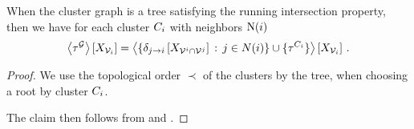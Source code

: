 \begin{theorem}
	When the cluster graph is a tree satisfying the running intersection property, then we have for each cluster $C_{i}$ with neighbors $\mathrm{N}(i)$
	\begin{align}
		\left\langle \tau^{\mathcal{G}}\right\rangle \left[ X_{\mathcal{V}_i} \right] =
		\left\langle \{ \delta_{j \rightarrow i}\left[X_{\mathcal{V}^{i}\cap\mathcal{V}^{j}}\right]  \, : \, j \in N(i) \} \cup \{\tau^{C_{i}}\}\right\rangle \left[ X_{\mathcal{V}_i} \right] \, .
	\end{align}
\end{theorem}
\begin{proof}
	We use the topological order $\prec$ of the clusters by the tree, when choosing a root by cluster $C_{i}$.

	The claim then follows from  and .
%

\end{proof}


